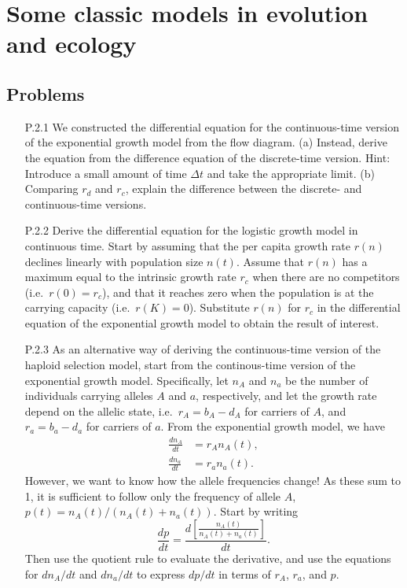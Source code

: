 \chapter{Some classic models in evolution and ecology}

\section{Problems}

\begin{enumerate}
	\item[P.2.1] We constructed the differential equation for the continuous-time version of the exponential growth model from the flow diagram. (a) Instead, derive the equation from the difference equation of the discrete-time version. Hint: Introduce a small amount of time $\Delta t$ and take the appropriate limit. (b) Comparing $r_d$ and $r_c$, explain the difference between the discrete- and continuous-time versions.
	
	\item[P.2.2] Derive the differential equation for the logistic growth model in continuous time. Start by assuming that the per capita growth rate $r(n)$ declines linearly with population size $n(t)$. Assume that $r(n)$ has a maximum equal to the intrinsic growth rate $r_c$ when there are no competitors (i.e.\ $r(0) = r_c$), and that it reaches zero when the population is at the carrying capacity (i.e.\ $r(K) = 0$). Substitute $r(n)$ for $r_c$ in the differential equation of the exponential growth model to obtain the result of interest.
	
	\item[P.2.3] As an alternative way of deriving the continuous-time version of the haploid selection model, start from the continous-time version of the exponential growth model. Specifically, let $n_A$ and $n_a$ be the number of individuals carrying alleles $A$ and $a$, respectively, and let the growth rate depend on the allelic state, i.e.\ $r_A = b_A - d_A$ for carriers of $A$, and $r_a = b_a - d_a$ for carriers of $a$. From the exponential growth model, we have
	\begin{subequations}
		\label{eq:haplselconttime}
		\begin{align}
			\frac{d n_A}{dt} &= r_A n_A(t),\\
			\frac{d n_a}{dt} &= r_a n_a(t).
		\end{align}
	\end{subequations}
	However, we want to know how the allele frequencies change! As these sum to 1, it is sufficient to follow only the frequency of allele $A$, $p(t)=n_A(t) / (n_A(t) + n_a(t))$. Start by writing
	\begin{equation}
		\label{eq:hapmodcont}
		\frac{dp}{dt} = \frac{d\left[\frac{n_A(t)}{n_A(t) + n_a(t)}\right]}{dt}.
	\end{equation}
	Then use the quotient rule to evaluate the derivative, and use the equations for $d n_A / d t$ and $d n_a / d t$ to express $dp/dt$ in terms of $r_A$, $r_a$, and $p$.
\end{enumerate}